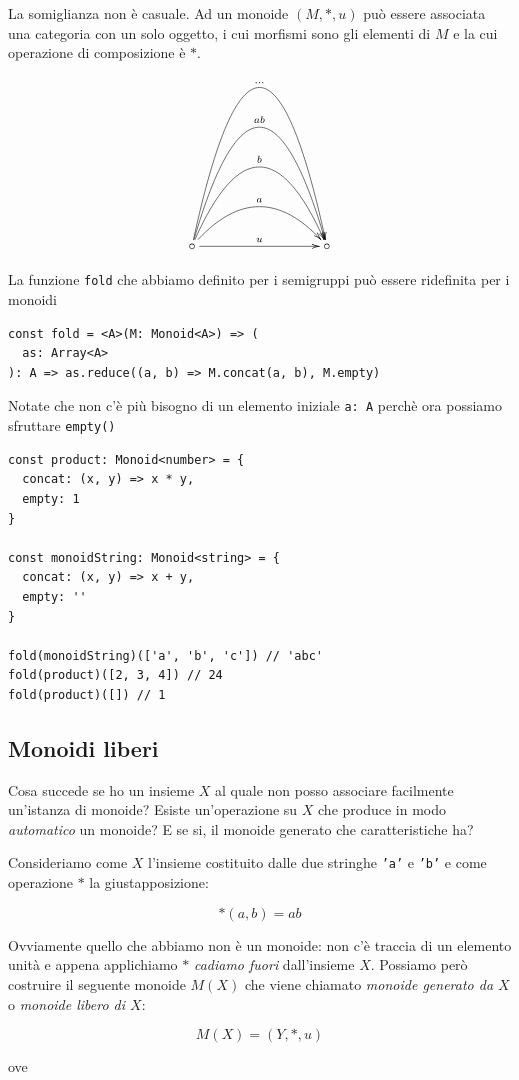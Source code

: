 \documentclass[12pt]{article}
\begin{document}
La somiglianza non è casuale. Ad un monoide $(M, *, u)$ può essere associata una categoria con un solo oggetto,
i cui morfismi sono gli elementi di $M$ e la cui operazione di composizione è $*$.

\[
\xymatrixrowsep{3cm}
\xymatrixcolsep{3cm}
\xymatrix{
  \circ \ar[r]^u \ar@/^1cm/[r]^a \ar@/^2cm/[r]^b \ar@/^3cm/[r]^{ab} \ar@/^4cm/[r]^{\ldots} & \circ
}
\]

La funzione \texttt{fold} che abbiamo definito per i semigruppi può essere ridefinita per i monoidi

\begin{verbatim}
const fold = <A>(M: Monoid<A>) => (
  as: Array<A>
): A => as.reduce((a, b) => M.concat(a, b), M.empty)
\end{verbatim}

Notate che non c'è più bisogno di un elemento iniziale \texttt{a: A} perchè ora possiamo sfruttare \texttt{empty()}

\begin{verbatim}
const product: Monoid<number> = {
  concat: (x, y) => x * y,
  empty: 1
}

const monoidString: Monoid<string> = {
  concat: (x, y) => x + y,
  empty: ''
}

fold(monoidString)(['a', 'b', 'c']) // 'abc'
fold(product)([2, 3, 4]) // 24
fold(product)([]) // 1
\end{verbatim}

\subsection{Monoidi liberi}

Cosa succede se ho un insieme $X$ al quale non posso associare facilmente un'istanza di monoide?
Esiste un'operazione su $X$ che produce in modo \emph{automatico} un monoide?
E se si, il monoide generato che caratteristiche ha?

Consideriamo come $X$ l'insieme costituito dalle due stringhe \texttt{'a'} e \texttt{'b'} e come operazione $*$ la giustapposizione:

$$
*(a, b) = ab
$$

Ovviamente quello che abbiamo non è un monoide: non c'è traccia di un elemento unità e appena applichiamo $*$ \emph{cadiamo fuori}
dall'insieme $X$. Possiamo però costruire il seguente monoide $M(X)$ che viene chiamato \emph{monoide generato da $X$} o \emph{monoide libero di $X$}:

$$
M(X) = (Y, *, u)
$$

ove
\end{document}
